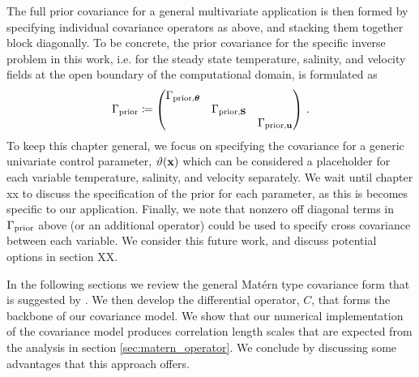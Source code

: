 The full prior covariance for a general multivariate application is then formed
by specifying individual covariance operators as above, and stacking them
together block diagonally.
To be concrete, the prior covariance for the specific inverse problem in this
work, i.e. for the steady state temperature, salinity,
and velocity fields at the open boundary of the computational domain,
is formulated as
\begin{equation*}
    \Gamma_{\text{prior}} \coloneqq
    \begin{pmatrix}
        \Gamma_{\text{prior,}{\bm{\theta}}} & & \\
        & \Gamma_{\text{prior,}\mathbf{S}} & \\
        & & \Gamma_{\text{prior,}\mathbf{u}} \\
    \end{pmatrix} \, .
\end{equation*}
To keep this chapter general, we focus on specifying the covariance for a generic
univariate control parameter, $\vartheta(\mathbf{x})$ which can be considered a placeholder
for each variable temperature, salinity, and velocity separately.
We wait until
chapter xx to discuss the specification of the prior
for each parameter, as this is becomes specific to our application.
Finally, we note that nonzero off diagonal terms in $\Gamma_{\text{prior}}$ above (or an
additional operator) could be used to specify cross covariance between each
variable.
We consider this future work, and discuss potential options in
section XX.

In the following sections we review the general Mat\'ern type covariance
form that is suggested by \citet{RSSB:RSSB777}.
We then develop the differential operator, $C$, that
forms the backbone of our covariance model.
We show that our numerical implementation of the covariance model produces correlation
length scales that are expected from the analysis in section
\ref{sec:matern_operator}.
We conclude by discussing some advantages that this approach offers.
